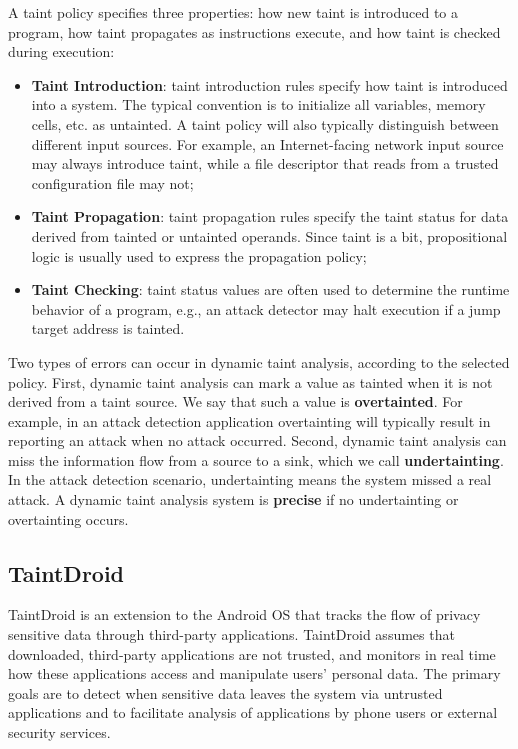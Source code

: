 A taint policy specifies three properties: how new taint is introduced to a program, how taint propagates as instructions execute, and how taint is checked during execution:
\begin{itemize}
	\item \textbf{Taint Introduction}: taint introduction rules specify how taint is introduced into a system. The typical convention is to initialize all variables, memory cells, etc. as untainted. A taint policy will also typically distinguish between different input sources. For example, an Internet-facing network input source may always introduce taint, while a file descriptor that reads from a trusted configuration file may not;
	\item \textbf{Taint Propagation}: taint propagation rules specify the taint status for data derived from tainted or untainted operands. Since taint is a bit, propositional logic is usually used to express the propagation policy;
	\item \textbf{Taint Checking}: taint status values are often used to determine the runtime behavior of a program, e.g., an attack detector may halt execution if a jump target address is tainted. 
\end{itemize}

Two types of errors can occur in dynamic taint analysis, according to the selected policy. First, dynamic taint analysis can mark a value as tainted when it is not derived from a taint source. We say that such a value is \textbf{overtainted}. For example, in an attack detection application overtainting will typically result in reporting an attack when no attack occurred. Second, dynamic taint analysis can miss the information flow from a source to a sink, which we call \textbf{undertainting}. In the attack detection scenario, undertainting means the system missed a real attack. A dynamic taint analysis system is \textbf{precise} if no undertainting or overtainting occurs.

\subsection{TaintDroid}
TaintDroid is an extension to the Android OS that tracks the flow of privacy sensitive data through third-party applications. TaintDroid assumes that downloaded, third-party applications are not trusted, and monitors in real time how these applications access and manipulate users' personal data. The primary goals are to detect when sensitive data leaves the system via untrusted applications and to facilitate analysis of applications by phone users or external security services.

